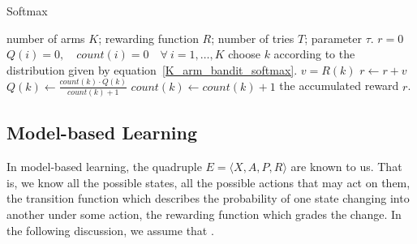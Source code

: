\begin{algorithm}
    \caption{Softmax}\label{Softmax_for_K_arm_bandit}
    \begin{algorithmic}[1]
        \Require number of arms $K$; rewarding function $R$; number of tries $T$; parameter $\tau$.
        \State $r = 0$
        \State $Q(i) = 0, \quad count(i) = 0\quad\forall~i=1,\ldots, K$
            \State choose $k$ according to the distribution given by equation~\eqref{K_arm_bandit_softmax}.
            \State $v = R(k)$
            \State $r \gets r + v$
            \State $Q(k) \gets \frac{count(k)\cdot Q(k)}{count(k) + 1}$
            \State $count(k) \gets count(k) + 1$
        \EndFor
        \Ensure the accumulated reward $r$.
    \end{algorithmic}
\end{algorithm}


\newpage
\subsection{Model-based Learning}
In model-based learning, the quadruple $E = \langle X, A, P, R\rangle$ are known to us. That is, we know all
the possible states, all the possible actions that may act on them, the transition function which describes
the probability of one state changing into another under some action, the rewarding function which grades the
change. In the following discussion, we assume that .

